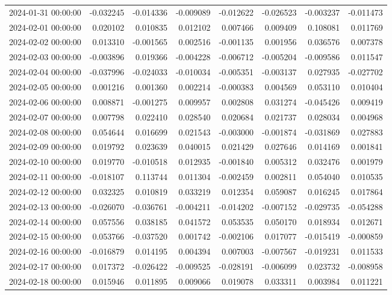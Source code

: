 \begin{tabular}{lrrrrrrr}
2024-01-31 00:00:00 & -0.032245 & -0.014336 & -0.009089 & -0.012622 & -0.026523 & -0.003237 & -0.011473 \\
2024-02-01 00:00:00 & 0.020102 & 0.010835 & 0.012102 & 0.007466 & 0.009409 & 0.108081 & 0.011769 \\
2024-02-02 00:00:00 & 0.013310 & -0.001565 & 0.002516 & -0.001135 & 0.001956 & 0.036576 & 0.007378 \\
2024-02-03 00:00:00 & -0.003896 & 0.019366 & -0.004228 & -0.006712 & -0.005204 & -0.009586 & 0.011547 \\
2024-02-04 00:00:00 & -0.037996 & -0.024033 & -0.010034 & -0.005351 & -0.003137 & 0.027935 & -0.027702 \\
2024-02-05 00:00:00 & 0.001216 & 0.001360 & 0.002214 & -0.000383 & 0.004569 & 0.053110 & 0.010404 \\
2024-02-06 00:00:00 & 0.008871 & -0.001275 & 0.009957 & 0.002808 & 0.031274 & -0.045426 & 0.009419 \\
2024-02-07 00:00:00 & 0.007798 & 0.022410 & 0.028540 & 0.020684 & 0.021737 & 0.028034 & 0.004968 \\
2024-02-08 00:00:00 & 0.054644 & 0.016699 & 0.021543 & -0.003000 & -0.001874 & -0.031869 & 0.027883 \\
2024-02-09 00:00:00 & 0.019792 & 0.023639 & 0.040015 & 0.021429 & 0.027646 & 0.014169 & 0.001841 \\
2024-02-10 00:00:00 & 0.019770 & -0.010518 & 0.012935 & -0.001840 & 0.005312 & 0.032476 & 0.001979 \\
2024-02-11 00:00:00 & -0.018107 & 0.113744 & 0.011304 & -0.002459 & 0.002811 & 0.054040 & 0.010535 \\
2024-02-12 00:00:00 & 0.032325 & 0.010819 & 0.033219 & 0.012354 & 0.059087 & 0.016245 & 0.017864 \\
2024-02-13 00:00:00 & -0.026070 & -0.036761 & -0.004211 & -0.014202 & -0.007152 & -0.029735 & -0.054288 \\
2024-02-14 00:00:00 & 0.057556 & 0.038185 & 0.041572 & 0.053535 & 0.050170 & 0.018934 & 0.012671 \\
2024-02-15 00:00:00 & 0.053766 & -0.037520 & 0.001742 & -0.002106 & 0.017077 & -0.015419 & -0.000859 \\
2024-02-16 00:00:00 & -0.016879 & 0.014195 & 0.004394 & 0.007003 & -0.007567 & -0.019231 & 0.011533 \\
2024-02-17 00:00:00 & 0.017372 & -0.026422 & -0.009525 & -0.028191 & -0.006099 & 0.023732 & -0.008958 \\
2024-02-18 00:00:00 & 0.015946 & 0.011895 & 0.009066 & 0.019078 & 0.033311 & 0.003984 & 0.011221 \\

\end{tabular}
